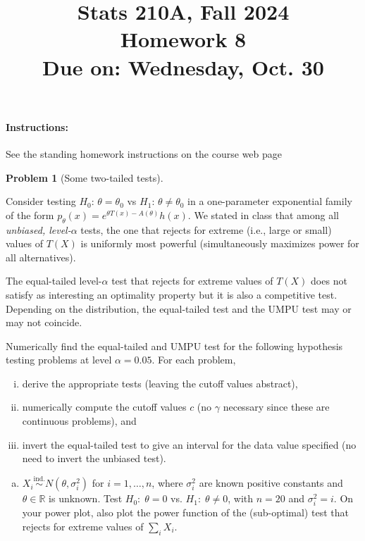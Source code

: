 \documentclass{article}
\newcommand{\RR}{\mathbb{R}}
\newcommand{\simind}{\overset{\text{ind.}}{\sim}}
\theoremstyle{definition}
\newtheorem{problem}{Problem}
\begin{document}
\title{Stats 210A, Fall 2024\\
  Homework 8 \\
  {\large {\bf Due on}: Wednesday, Oct. 30}}
\date{}

\maketitle

\paragraph{Instructions:} See the standing homework instructions on the course web page

\begin{problem}[Some two-tailed tests]
\label{prob:two-tailed}

Consider testing $H_0:\,\theta = \theta_0$ vs $H_1:\,\theta \neq \theta_0$ in a one-parameter exponential family of the form $p_\theta(x) = e^{\theta T(x) - A(\theta)}h(x)$. We stated in class that among all {\em unbiased, level-$\alpha$} tests, the one that rejects for extreme (i.e., large or small) values of $T(X)$ is uniformly most powerful (simultaneously maximizes power for all alternatives).

The equal-tailed level-$\alpha$ test that rejects for extreme values of $T(X)$ does not satisfy as interesting an optimality property but it is also a competitive test. Depending on the distribution, the equal-tailed test and the UMPU test may or may not coincide.

Numerically find the equal-tailed and UMPU test for the following hypothesis testing problems at level $\alpha=0.05$. For each problem,
\begin{enumerate}[(i)]
\item derive the appropriate tests (leaving the cutoff values abstract), 
\item numerically compute the cutoff values $c$ (no $\gamma$ necessary since these are continuous problems), and 
\item invert the equal-tailed test to give an interval for the data value specified (no need to invert the unbiased test).
\end{enumerate}

\begin{enumerate}[(a)]

\item $X_i \simind N(\theta, \sigma_i^2)$ for $i=1,\ldots,n$, where $\sigma_i^2$ are known positive constants and $\theta \in \RR$ is unknown. Test $H_0:\; \theta = 0$ vs. $H_1:\; \theta \neq 0$, with $n = 20$ and $\sigma_i^2 = i$. On your power plot, also plot the power function of the (sub-optimal) test that rejects for extreme values of $\sum_i X_i$.






\end{enumerate}
\end{problem}
\end{document}
